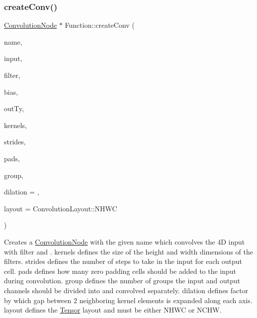 \subsubsection{\texorpdfstring{create\+Conv()}{createConv()}\hspace{0.1cm}{\footnotesize\ttfamily [1/4]}}
{\footnotesize\ttfamily \hyperlink{classglow_1_1_convolution_node}{Convolution\+Node} $\ast$ Function\+::create\+Conv (\begin{DoxyParamCaption}\item[{llvm\+::\+String\+Ref}]{name,  }\item[{\hyperlink{structglow_1_1_node_value}{Node\+Value}}]{input,  }\item[{\hyperlink{structglow_1_1_node_value}{Node\+Value}}]{filter,  }\item[{\hyperlink{structglow_1_1_node_value}{Node\+Value}}]{bias,  }\item[{\hyperlink{structglow_1_1_type}{Type\+Ref}}]{out\+Ty,  }\item[{llvm\+::\+Array\+Ref$<$ \hyperlink{namespaceglow_a0ca574644e1e42ef193a9947fb4d8911}{unsigned\+\_\+t} $>$}]{kernels,  }\item[{llvm\+::\+Array\+Ref$<$ \hyperlink{namespaceglow_a0ca574644e1e42ef193a9947fb4d8911}{unsigned\+\_\+t} $>$}]{strides,  }\item[{llvm\+::\+Array\+Ref$<$ \hyperlink{namespaceglow_a0ca574644e1e42ef193a9947fb4d8911}{unsigned\+\_\+t} $>$}]{pads,  }\item[{\hyperlink{namespaceglow_a0ca574644e1e42ef193a9947fb4d8911}{unsigned\+\_\+t}}]{group,  }\item[{\hyperlink{namespaceglow_a0ca574644e1e42ef193a9947fb4d8911}{unsigned\+\_\+t}}]{dilation = {},  }\item[{\hyperlink{namespaceglow_aa2f3a33e05699df0f42295c5c4bd1f77}{Convolution\+Layout}}]{layout = {\ttfamily ConvolutionLayout\+:\+:NHWC} }\end{DoxyParamCaption})}

Creates a \hyperlink{classglow_1_1_convolution_node}{Convolution\+Node} with the given {\ttfamily name} which convolves the 4D {\ttfamily input} with {\ttfamily filter} and . {\ttfamily kernels} defines the size of the height and width dimensions of the filters. {\ttfamily strides} defines the number of steps to take in the input for each output cell. {\ttfamily pads} defines how many zero padding cells should be added to the input during convolution. {\ttfamily group} defines the number of groups the input and output channels should be divided into and convolved separately. {\ttfamily dilation} defines factor by which gap between 2 neighboring kernel elements is expanded along each axis. {\ttfamily layout} defines the \hyperlink{classglow_1_1_tensor}{Tensor} layout and must be either N\+H\+WC or N\+C\+HW. \mbox{\label{classglow_1_1_function_ad16bccb2690886aa72ad02131f9caf2c}} 
